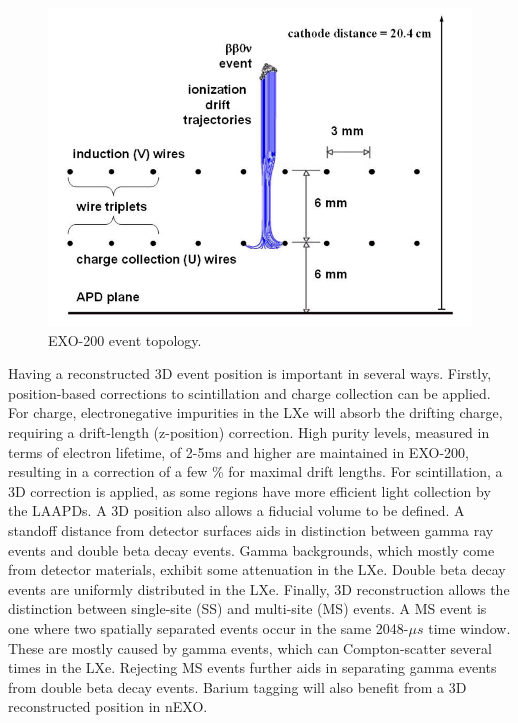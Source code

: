 \begin{figure} %
	\centering
	\includegraphics[width=.7\textwidth]{figures/anodecathodedriftcharges.png}
	\caption{EXO-200 event topology.  }
\label{fig:detectionplane}
\end{figure}

Having a reconstructed 3D event position is important in several ways.  Firstly, position-based corrections to scintillation and charge collection can be applied.  For charge, electronegative impurities in the LXe will absorb the drifting charge, requiring a drift-length (z-position) correction.  High purity levels, measured in terms of electron lifetime, of 2-5ms and higher are maintained in EXO-200, resulting in a correction of a few \% for maximal drift lengths.  For scintillation, a 3D correction is applied, as some regions have more efficient light collection by the LAAPDs.  A 3D position also allows a fiducial volume to be defined.  A standoff distance from detector surfaces aids in distinction between gamma ray events and double beta decay events.  Gamma backgrounds, which mostly come from detector materials, exhibit some attenuation in the LXe.  Double beta decay events are uniformly distributed in the LXe.  Finally, 3D reconstruction allows the distinction between single-site (SS) and multi-site (MS) events.  A MS event is one where two spatially separated events occur in the same 2048-$\mu s$ time window.  These are mostly caused by gamma events, which can Compton-scatter several times in the LXe.  Rejecting MS events further aids in separating gamma events from double beta decay events.  \cite{EXO200TwoNuLong} Barium tagging will also benefit from a 3D reconstructed position in nEXO.


